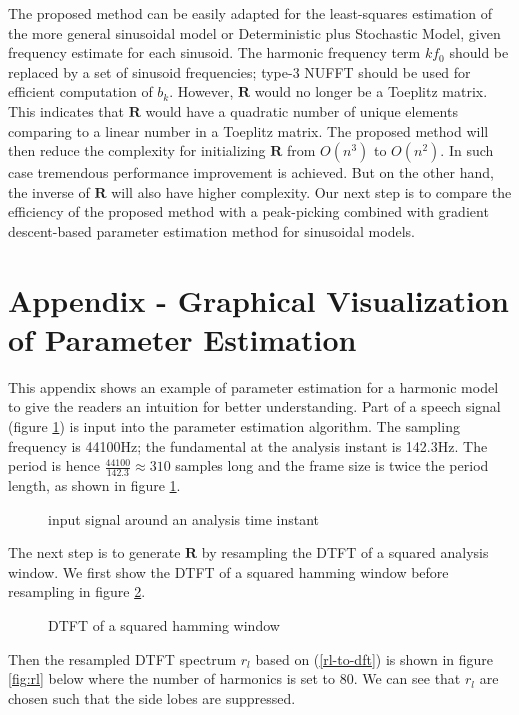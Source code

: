 \documentclass[dvips]{article}
\newcommand{\matr}[1]{\mathbf{#1}}
\begin{document}
The proposed method can be easily adapted for the least-squares estimation of the more general sinusoidal model or Deterministic plus Stochastic Model\cite{serra-1990}, given frequency estimate for each sinusoid. The harmonic frequency term $k f_0$ should be replaced by a set of sinusoid frequencies; type-3 NUFFT\cite{greengard-2004} should be used for efficient computation of $b_k$. However, $\matr{R}$ would no longer be a Toeplitz matrix. This indicates that $\matr{R}$ would have a quadratic number of unique elements comparing to a linear number in a Toeplitz matrix. The proposed method will then reduce the complexity for initializing $\matr{R}$ from $O(n^3)$ to $O(n^2)$. In such case tremendous performance improvement is achieved. But on the other hand, the inverse of $\matr{R}$ will also have higher complexity. Our next step is to compare the efficiency of the proposed method with a peak-picking combined with gradient descent-based parameter estimation method for sinusoidal models\cite{hua-2014}.

\section*{Appendix - Graphical Visualization of Parameter Estimation}

This appendix shows an example of parameter estimation for a harmonic model to give the readers an intuition for better understanding. Part of a speech signal (figure \ref{fig:s}) is input into the parameter estimation algorithm. The sampling frequency is 44100Hz; the fundamental at the analysis instant is 142.3Hz. The period is hence $\frac{44100}{142.3} \approx 310$ samples long and the frame size is twice the period length, as shown in figure \ref{fig:s}.

\begin{figure}[H]
\centering

\caption{input signal around an analysis time instant}
\label{fig:s}
\end{figure}

The next step is to generate $\matr{R}$ by resampling the DTFT of a squared analysis window. We first show the DTFT of a squared hamming window before resampling in figure \ref{fig:sqhamm}.

\begin{figure}[H]
\centering

\caption{DTFT of a squared hamming window}
\label{fig:sqhamm}
\end{figure}

Then the resampled DTFT spectrum $r_l$ based on (\ref{rl-to-dft}) is shown in figure \ref{fig:rl} below where the number of harmonics is set to 80. We can see that $r_l$ are chosen such that the side lobes are suppressed.
\end{document}
